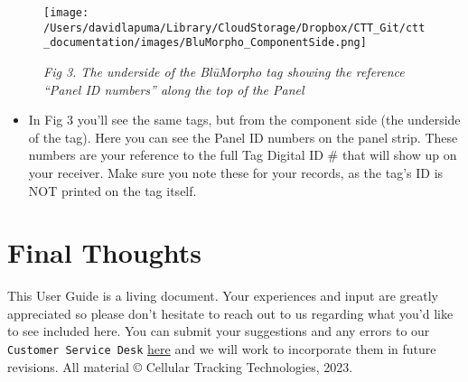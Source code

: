 \documentclass[
]{article}
\providecommand{\tightlist}{%
  \setlength{\itemsep}{0pt}\setlength{\parskip}{0pt}}
\begin{document}
\begin{figure}
\hypertarget{id}{%
\centering
\texttt{[image: /Users/davidlapuma/Library/CloudStorage/Dropbox/CTT\_Git/ctt\_documentation/images/BluMorpho\_ComponentSide.png]}
\caption{\emph{Fig 3. The underside of the BlūMorpho tag showing the
reference ``Panel ID numbers'' along the top of the Panel}}\label{id}
}
\end{figure}

\begin{itemize}
\tightlist
\item
  In Fig 3 you'll see the same tags, but from the component side (the
  underside of the tag). Here you can see the Panel ID numbers on the
  panel strip. These numbers are your reference to the full Tag Digital
  ID \# that will show up on your receiver. Make sure you note these for
  your records, as the tag's ID is NOT printed on the tag itself.
\end{itemize}

\hypertarget{final-thoughts}{%
\section{Final Thoughts}\label{final-thoughts}}

This User Guide is a living document. Your experiences and input are
greatly appreciated so please don't hesitate to reach out to us
regarding what you'd like to see included here. You can submit your
suggestions and any errors to our \texttt{Customer\ Service\ Desk}
\href{https://celltracktech.com/pages/customer-service-desk-csd}{here}
and we will work to incorporate them in future revisions. All material ©
Cellular Tracking Technologies, 2023.
\end{document}

